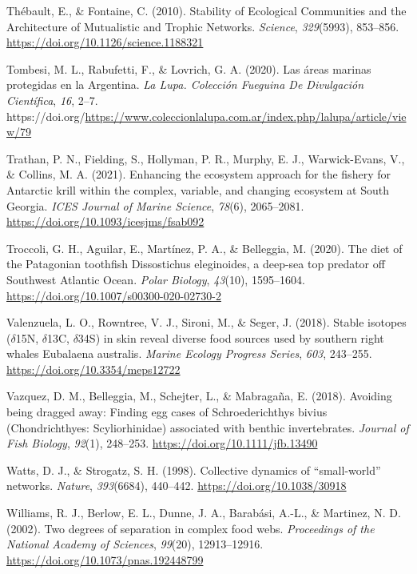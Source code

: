 \documentclass[preprint, 3p,
authoryear]{elsarticle} %
\newlength{\cslhangindent}
\newlength{\cslentryspacingunit} %
\newenvironment{CSLReferences}[2] %
 {%
  \setlength{\parindent}{0pt}
  \ifodd #1
  \let\oldpar\par
  \def\par{\hangindent=\cslhangindent\oldpar}
  \fi
  \setlength{\parskip}{#2\cslentryspacingunit}
 }%
 {}
\begin{document}
\begin{CSLReferences}{1}{0}
\leavevmode{}%
Thébault, E., \& Fontaine, C. (2010). Stability of {Ecological
Communities} and the {Architecture} of {Mutualistic} and {Trophic
Networks}. \emph{Science}, \emph{329}(5993), 853--856.
\url{https://doi.org/10.1126/science.1188321}

\leavevmode{}%
Tombesi, M. L., Rabufetti, F., \& Lovrich, G. A. (2020). Las áreas
marinas protegidas en la {Argentina}. \emph{La Lupa. Colección Fueguina
De Divulgación Científica}, \emph{16}, 2--7.
https://doi.org/\url{https://www.coleccionlalupa.com.ar/index.php/lalupa/article/view/79}

\leavevmode{}%
Trathan, P. N., Fielding, S., Hollyman, P. R., Murphy, E. J.,
Warwick-Evans, V., \& Collins, M. A. (2021). Enhancing the ecosystem
approach for the fishery for {Antarctic} krill within the complex,
variable, and changing ecosystem at {South Georgia}. \emph{ICES Journal
of Marine Science}, \emph{78}(6), 2065--2081.
\url{https://doi.org/10.1093/icesjms/fsab092}

\leavevmode{}%
Troccoli, G. H., Aguilar, E., Martínez, P. A., \& Belleggia, M. (2020).
The diet of the {Patagonian} toothfish {Dissostichus} eleginoides, a
deep-sea top predator off {Southwest Atlantic Ocean}. \emph{Polar
Biology}, \emph{43}(10), 1595--1604.
\url{https://doi.org/10.1007/s00300-020-02730-2}

\leavevmode{}%
Valenzuela, L. O., Rowntree, V. J., Sironi, M., \& Seger, J. (2018).
Stable isotopes ({\(\delta\)15N}, {\(\delta\)13C}, {\(\delta\)34S}) in
skin reveal diverse food sources used by southern right whales
{Eubalaena} australis. \emph{Marine Ecology Progress Series},
\emph{603}, 243--255. \url{https://doi.org/10.3354/meps12722}

\leavevmode{}%
Vazquez, D. M., Belleggia, M., Schejter, L., \& Mabragaña, E. (2018).
Avoiding being dragged away: Finding egg cases of {Schroederichthys}
bivius ({Chondrichthyes}: {Scyliorhinidae}) associated with benthic
invertebrates. \emph{Journal of Fish Biology}, \emph{92}(1), 248--253.
\url{https://doi.org/10.1111/jfb.13490}

\leavevmode{}%
Watts, D. J., \& Strogatz, S. H. (1998). Collective dynamics of
{``small-world''} networks. \emph{Nature}, \emph{393}(6684), 440--442.
\url{https://doi.org/10.1038/30918}

\leavevmode{}%
Williams, R. J., Berlow, E. L., Dunne, J. A., Barabási, A.-L., \&
Martinez, N. D. (2002). Two degrees of separation in complex food webs.
\emph{Proceedings of the National Academy of Sciences}, \emph{99}(20),
12913--12916. \url{https://doi.org/10.1073/pnas.192448799}

\end{CSLReferences}
\end{document}
